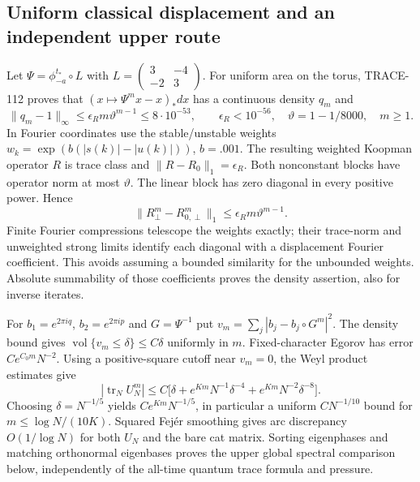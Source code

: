 \subsection{Uniform classical displacement and an independent upper route}
Let $\Psi=\phi_{-a}^{t_*}\circ L$ with
$L=\left(\begin{smallmatrix}3&-4\\-2&3\end{smallmatrix}\right)$.
For uniform area on the torus, TRACE-112 proves that
$(x\mapsto\Psi^mx-x)_*dx$ has a continuous density $q_m$ and
\[
\|q_m-1\|_\infty\le\epsilon_Rm\vartheta^{m-1}
\le8\cdot10^{-53},\qquad
\epsilon_R<10^{-56},\quad\vartheta=1-1/8000,
\quad m\ge1.
\]
In Fourier coordinates use the stable/unstable weights
$w_k=\exp(b(|s(k)|-|u(k)|))$, $b=.001$.
The resulting weighted Koopman operator $R$ is trace class and
$\|R-R_0\|_1=\epsilon_R$. Both nonconstant blocks have operator norm
at most $\vartheta$. The linear block has zero diagonal in every
positive power. Hence
\[
\|R_\perp^m-R_{0,\perp}^m\|_1
\le\epsilon_Rm\vartheta^{m-1}.
\]
Finite Fourier compressions telescope the weights exactly; their trace-norm
and unweighted strong limits identify each diagonal with a displacement
Fourier coefficient. This avoids assuming a bounded similarity for the
unbounded weights. Absolute summability of those coefficients proves the
density assertion, also for inverse iterates.

For $b_1=e^{2\pi iq}$, $b_2=e^{2\pi ip}$ and $G=\Psi^{-1}$ put
$v_m=\sum_j|b_j-b_j\circ G^m|^2$. The density bound gives
$\operatorname{vol}\{v_m\le\delta\}\le C\delta$ uniformly in $m$.
Fixed-character Egorov has error $Ce^{C_0m}N^{-2}$.
Using a positive-square cutoff near $v_m=0$, the Weyl product estimates give
\[
|\operatorname{tr}_NU_N^m|\le
C\bigl[\delta+e^{Km}N^{-1}\delta^{-4}
+e^{Km}N^{-2}\delta^{-8}\bigr].
\]
Choosing $\delta=N^{-1/5}$ yields $Ce^{Km}N^{-1/5}$, in particular a
uniform $CN^{-1/10}$ bound for $m\le\log N/(10K)$.
Squared Fej\'er smoothing gives arc discrepancy $O(1/\log N)$ for
both $U_N$ and the bare cat matrix. Sorting eigenphases and matching
orthonormal eigenbases proves the upper global spectral comparison below,
independently of the all-time quantum trace formula and pressure.

